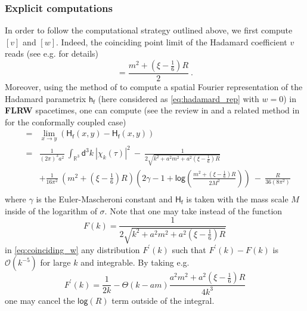 \documentclass[11pt]{book}
\renewcommand{\log}{\mathsf{log}}
\newcommand{\abs}[1]{\left|#1\right|}
\newcommand{\Ocal}{\mathcal{O}}
\newcommand{\Rbb}{\mathbb{R}}
\newcommand{\Hsf}{\mathsf{H}}
\newcommand{\dsf}{\mathsf{d}}
\newcommand{\fsf}{\mathsf{f}}
\newcommand{\hsf}{\mathsf{h}}
\theoremstyle{break}
\begin{document}
\subsubsection{Explicit computations}


In order to follow the computational strategy outlined above, we first compute $[v]$ and $[w]$.  Indeed, the coinciding point limit of the Hadamard coefficient $v$ reads (see e.g. \cite[Section III.1.2]{HACK_2010} for details)
%
\begin{equation*}
[v]=\frac{m^2+\left(\xi-\frac16\right)R}{2} \ .
\label{eq:coinciding_v}
\end{equation*}
%
Moreover, using the method of \cite{schlemmer_2010} to compute a spatial Fourier representation of the Hadamard parametrix $\hsf_\fsf$ (here considered as \eqref{eq:hadamard_rep} with $w=0$) in \textbf{FLRW} spacetimes, one can compute (see the review in \cite{degner_2013} and a related method in \cite{PINAMONTI_2011} for the conformally coupled case)
%
\begin{eqnarray}
[w] &=& \lim_{x\to y} \left(\Hsf_\fsf(x,y) - \Hsf_\fsf(x,y) \right) \nonumber \\
&=& \frac{1}{(2\pi)^3 a^2} \ \int_{\Rbb^3} \dsf^3k \ \abs{\chi_k(\tau)}^2 \ - \ \frac{1}{2\sqrt{k^2+a^2m^2+a^2\left(\xi-\frac16\right)R}} \nonumber \\
%
&& + \frac{1}{16\pi^2} \ \left(m^2+\left(\xi-\frac16\right)R\right)\left(2\gamma-1+\log\left(
\frac{m^2+\left(\xi-\frac16\right)R}{2M^2}\right)\right) \ - \ \frac{R}{36(8\pi^2)} \nonumber \\
\label{eq:coinciding_w} 
\end{eqnarray}
%
where $\gamma$ is the Euler-Mascheroni constant and $\Hsf_\fsf$ is taken with the mass scale $M$ inside of the logarithm of $\sigma$. Note that one may take instead of the function 
%
\begin{equation*}
F(k) = \frac{1}{2\sqrt{k^2+a^2m^2+a^2\left(\xi-\frac16\right)R}}
\end{equation*}
%
in \eqref{eq:coinciding_w} any distribution $F^\prime(k)$ such that $F^\prime(k)-F(k)$ is $\Ocal(k^{-5})$ for large $k$ and integrable. By taking e.g. 
%
\begin{equation*}
F^\prime(k) = \frac{1}{2k} - \Theta(k-am)\frac{a^2 m^2 + a^2 \left( \xi - \frac16 \right) R}{4k^3}
\end{equation*}
%
one may cancel the $\log\left(R\right)$ term outside of the integral.
\end{document}
